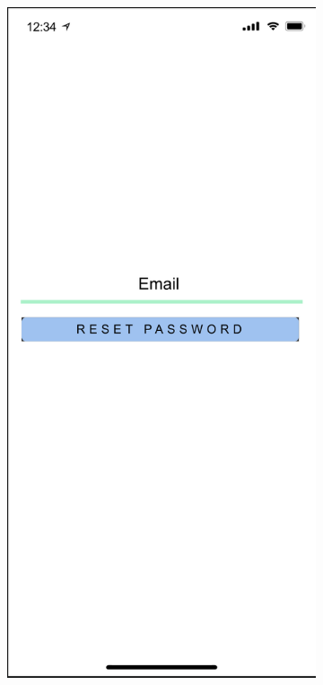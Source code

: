 \begin{figure}[H]
    \centering
    \begin{subfigure}[b]{0.3\textwidth}
        \centering
        \includegraphics[width=\textwidth]{./graphics/design/Sign In - Forgotten Password Colour.png}

\end{subfigure}
\end{figure}
